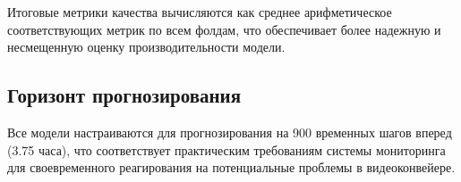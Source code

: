 Итоговые метрики качества вычисляются как среднее арифметическое соответствующих метрик по всем фолдам, что обеспечивает более надежную и несмещенную оценку производительности модели.

\subsection{Горизонт прогнозирования}

Все модели настраиваются для прогнозирования на 900 временных шагов вперед (3.75 часа), что соответствует практическим требованиям системы мониторинга для своевременного реагирования на потенциальные проблемы в видеоконвейере. 